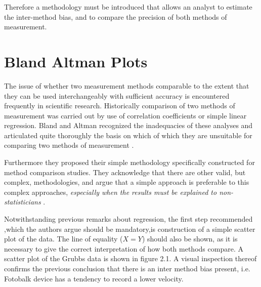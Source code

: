 \documentclass[Chap1main.tex]{subfiles}
\begin{document}
Therefore a methodology must be introduced that allows an analyst
to estimate the inter-method bias, and to compare the precision of
both methods of measurement.
\newpage
\section{Bland Altman Plots}
The issue of whether two measurement methods comparable to the
extent that they can be used interchangeably with sufficient
accuracy is encountered frequently in scientific research.
Historically comparison of two methods of measurement was carried
out by use of correlation coefficients or simple linear
regression. Bland and Altman recognized the inadequacies of these
analyses and articulated quite thoroughly the basis on which of
which they are unsuitable for comparing two methods of measurement
\citep*{BA83}.


Furthermore they proposed their simple methodology specifically
constructed for method comparison studies. They acknowledge that
there are other valid, but complex, methodologies, and argue that
a simple approach is preferable to this complex approaches,
\emph{especially when the results must be explained to
non-statisticians} \citep*{BA83}.

\smallskip

Notwithstanding previous remarks about regression, the first step
recommended ,which the authors argue should be mandatory,is
construction of a simple scatter plot of the data. The line of
equality ($X=Y$) should also be shown, as it is necessary to give
the correct interpretation of how both methods compare. A scatter
plot of the Grubbs data is shown in figure 2.1. A visual
inspection thereof confirms the previous conclusion that there is
an inter method bias present, i.e. Fotobalk device has a tendency
to record a lower velocity.
\end{document}
